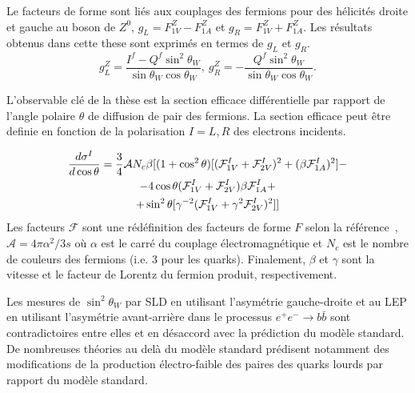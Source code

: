 Le facteurs de forme sont liés aux couplages des fermions pour des hélicités droite et gauche au boson de $Z^0$, $g_L = F^Z_{1V} - F^Z_{1A}$  et $g_R = F^Z_{1V} + F^Z_{1A}$.
Les résultats obtenus dans cette these sont exprimés en termes de $g_L$ et $g_R$.  
\begin{equation}
g_L^Z = \frac{I^f - Q^f\sin^2\theta_W}{\sin\theta_W\cos\theta_W}, \  g_R^Z = -\frac{Q^f\sin^2\theta_W}{\sin\theta_W\cos\theta_W}.
\label{formula:EWcouplings_3F}
\end{equation}

L'observable clé de la thèse est la section efficace différentielle par rapport de l'angle polaire $\theta$ de diffusion de pair des fermions. La section efficace peut être definie en fonction de la polarisation $I=L, R$  des electrons incidents.    

\begin{multline}
\label{formula:DiffSigma_3F}
\frac{d\sigma^I}{d\cos\theta} = \frac{3}{4} \mathcal{A} N_c \beta[ (1+\cos^2\theta) [(\mathcal{F}^I_{1V}+\mathcal{F}^I_{2V})^2+(\beta \mathcal{F}^I_{1A})^2] - \\-4 \cos\theta (\mathcal{F}^I_{1V}+\mathcal{F}^I_{2V})\beta \mathcal{F}^I_{1A} +\\+ \sin^2\theta [\gamma ^{-2} (\mathcal{F}^I_{1V} +\gamma^2 \mathcal{F}^I_{2V})^2] ]
\end{multline}
Les facteurs $\mathcal{F}$ sont une rédéfinition des facteurs de forme $F$ selon la référence~\cite{bib:Schmidt}, $\mathcal{A} = 4\pi\alpha^2/3s$ où $\alpha$ est le carré du couplage électromagnétique et $N_c$ est le nombre de couleurs des fermions (i.e. 3 pour les  quarks). Finalement, $\beta$ et $\gamma$ sont la vitesse et le facteur de Lorentz du fermion produit, respectivement.

Les mesures de $\sin^2\theta_W$ par SLD en utilisant l'asymétrie gauche-droite et au LEP en utilisant l'asymétrie avant-arrière dans le processus $e^+e^-\to b\bar{b}$ sont contradictoires entre elles et en désaccord avec la prédiction du modèle standard.  
De nombreuses théories au delà du modèle standard prédisent notamment des modifications de la production électro-faible des paires des quarks lourds par rapport du modèle standard.
\newpage
